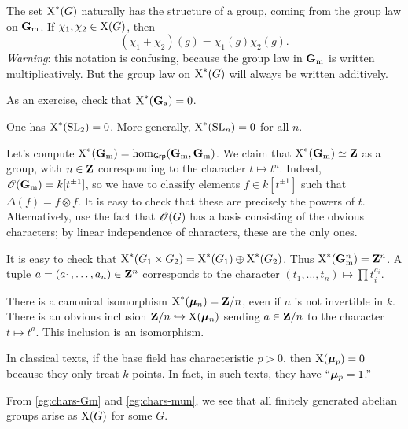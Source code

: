 The set $\operatorname{X}^\ast(G)$ naturally has the structure of a group, coming from 
the group law on $\mathbf{G}_\mathrm{m}$. If $\chi_1,\chi_2\in \operatorname{X}(G)$, then 
\[
  (\chi_1+\chi_2)(g) = \chi_1(g)\chi_2(g) .
\]
\emph{Warning}: this notation is confusing, because the group law in $\mathbf{G}_\mathrm{m}$ is 
written multiplicatively. But the group law on $\operatorname{X}^\ast(G)$ will always be 
written additively. 

\begin{example}
As an exercise, check that $\operatorname{X}^\ast(\mathbf{G}_\mathrm{a})=0$. 
\end{example}

\begin{example}
One has $\operatorname{X}^\ast(\operatorname{SL}_2)=0$. More generally, $\operatorname{X}^\ast(\operatorname{SL}_n)=0$ for all 
$n$. 
\end{example}

\begin{example}\label{eg:chars-Gm}
Let's compute $\operatorname{X}^\ast(\mathbf{G}_\mathrm{m})=\hom_{\mathsf{Grp}}(\mathbf{G}_\mathrm{m},\mathbf{G}_\mathrm{m})$. We claim that 
$\operatorname{X}^\ast(\mathbf{G}_\mathrm{m})\simeq \mathbf{Z}$ as a group, with $n\in \mathbf{Z}$ corresponding to the 
character $t\mapsto t^n$. Indeed, $\mathscr{O}(\mathbf{G}_\mathrm{m})=k[t^{\pm 1}]$, so we have to 
classify elements $f\in k[t^{\pm 1}]$ such that $\Delta(f)=f\otimes f$. It is 
easy to check that these are precisely the powers of $t$. Alternatively, use 
the fact that $\mathscr{O}(G)$ has a basis consisting of the obvious characters; by 
linear independence of characters, these are the only ones. 
\end{example}

It is easy to check that 
$\operatorname{X}^\ast(G_1\times G_2)=\operatorname{X}^\ast(G_1)\oplus \operatorname{X}^\ast(G_2)$. Thus 
$\operatorname{X}^\ast(\mathbf{G}_\mathrm{m}^n) = \mathbf{Z}^n$. A tuple $a=(a_1,\dots,a_n)\in \mathbf{Z}^n$ corresponds 
to the character $(t_1,\dots,t_n)\mapsto \prod t_i^{a_i}$. 

\begin{example}\label{eg:chars-mun}
There is a canonical isomorphism $\operatorname{X}^\ast(\bm{\mu}_n)=\mathbf{Z}/n$, even if 
$n$ is not invertible in $k$. There is an obvious inclusion 
$\mathbf{Z}/n\hookrightarrow \operatorname{X}(\bm{\mu}_n)$ sending $a\in \mathbf{Z}/n$ to the character 
$t\mapsto t^a$. This inclusion is an isomorphism. 
\end{example}

In classical texts, if the base field has characteristic $p>0$, then 
$\operatorname{X}(\bm{\mu}_p)=0$ because they only treat $\bar k$-points. In fact, in 
such texts, they have ``$\bm{\mu}_p=1$.'' 

From \autoref{eg:chars-Gm} and \autoref{eg:chars-mun}, we see that all finitely 
generated abelian groups arise as $\operatorname{X}(G)$ for some $G$. 

